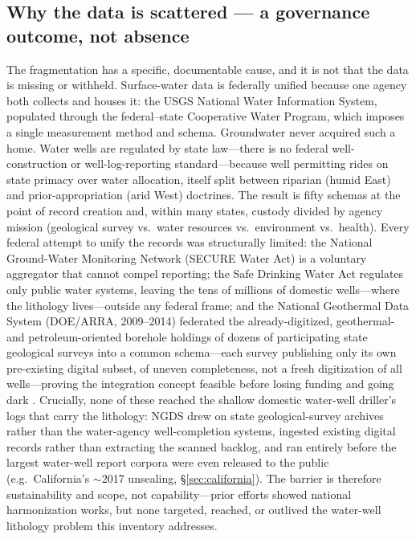 \documentclass[12pt]{article}
\begin{document}
\subsection{Why the data is scattered --- a governance outcome, not absence}
\label{sec:scattered}
The fragmentation has a specific, documentable cause, and it is not that the data is missing or
withheld. Surface-water data is federally unified because one agency both collects and houses it: the USGS
National Water Information System, populated through the federal--state Cooperative Water Program, which
imposes a single measurement method and schema. Groundwater never
acquired such a home. Water wells are regulated by state law---there is no federal well-construction
or well-log-reporting standard---because well permitting rides on state primacy over water allocation,
itself split between riparian (humid East) and prior-appropriation (arid West) doctrines. The result is
fifty schemas at the point of record creation and, within many states, custody divided by agency mission
(geological survey vs.\ water resources vs.\ environment vs.\ health). Every federal attempt to unify the
records was structurally limited: the National Ground-Water Monitoring Network (SECURE Water Act) is a
voluntary aggregator that cannot compel reporting; the Safe Drinking Water Act regulates only public
water systems, leaving the tens of millions of domestic wells---where the lithology lives---outside any
federal frame; and the National Geothermal Data System (DOE/ARRA, 2009--2014) federated the already-digitized,
geothermal- and petroleum-oriented borehole holdings of dozens of participating state geological surveys into a
common schema---each survey publishing only its own pre-existing digital subset, of uneven completeness, not a
fresh digitization of all wells---proving the integration concept feasible before losing funding and going
dark \citep{ngds_sustain}. Crucially, none of these reached the shallow domestic water-well driller's logs that carry
the lithology: NGDS drew on state geological-survey archives rather than the water-agency well-completion
systems, ingested existing digital records rather than extracting the scanned backlog, and ran entirely
before the largest water-well report corpora were even released to the public (e.g.\ California's
$\sim$2017 unsealing, \S\ref{sec:california}). The barrier is therefore sustainability and scope, not
capability---prior efforts showed national harmonization works, but none targeted, reached, or outlived the
water-well lithology problem this inventory addresses.
\end{document}
